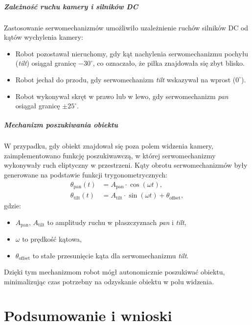 \documentclass[a4paper,twoside,12pt]{book}
\begin{document}
\paragraph{Zależność ruchu kamery i silników DC}
Zastosowanie serwomechanizmów umożliwiło uzależnienie ruchów silników DC od kątów wychylenia kamery:
\begin{itemize}
    \item Robot pozostawał nieruchomy, gdy kąt nachylenia serwomechanizmu pochyłu (\textit{tilt}) osiągał granicę $-30^\circ$, co oznaczało, że piłka znajdowała się zbyt blisko.
    \item Robot jechał do przodu, gdy serwomechanizm \textit{tilt} wskazywał na wprost ($0^\circ$).
    \item Robot wykonywał skręt w prawo lub w lewo, gdy serwomechanizm \textit{pan} osiągał granicę $\pm 25^\circ$.
\end{itemize}

\paragraph{Mechanizm poszukiwania obiektu}
W przypadku, gdy obiekt znajdował się poza polem widzenia kamery, zaimplementowano funkcję poszukiwawczą, w której serwomechanizmy wykonywały ruch eliptyczny w przestrzeni. Kąty obrotu serwomechanizmów były generowane na podstawie funkcji trygonometrycznych:
\begin{align}
    \theta_{\text{pan}}(t) &= A_{\text{pan}} \cdot \cos(\omega t), \\
    \theta_{\text{tilt}}(t) &= A_{\text{tilt}} \cdot \sin(\omega t) + \theta_{\text{offset}},
\end{align}
gdzie:
\begin{itemize}
    \item $A_{\text{pan}}$, $A_{\text{tilt}}$ to amplitudy ruchu w płaszczyznach \textit{pan} i \textit{tilt},
    \item $\omega$ to prędkość kątowa,
    \item $\theta_{\text{offset}}$ to stałe przesunięcie kąta dla serwomechanizmu \textit{tilt}.
\end{itemize}

Dzięki tym mechanizmom robot mógł autonomicznie poszukiwać obiektu, minimalizując czas potrzebny na odzyskanie obiektu w polu widzenia.

\chapter{Podsumowanie i wnioski}
\label{ch:07}
\end{document}
